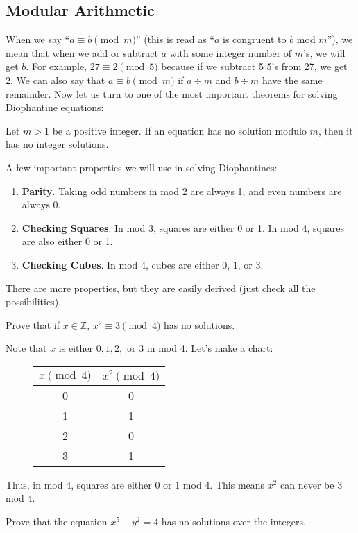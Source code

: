 \documentclass{article}
\begin{document}
\subsection{Modular Arithmetic}
When we say ``$a\equiv b\pmod{m}$'' (this is read as ``$a$ is congruent to $b$ mod $m$''), we mean that when we add or subtract $a$ with some integer number of $m$'s, we will get $b$. For example, $27\equiv 2\pmod{5}$ because if we subtract 5 5's from 27, we get 2. We can also say that $a\equiv b\pmod{m}$ if $a\div m$ and $b\div m$ have the same remainder. Now let us turn to one of the most important theorems for solving Diophantine equations:
\begin{theo} 
Let $m>1$ be a positive integer. If an equation has no solution modulo $m$, then it has no integer solutions.
\end{theo}
A few important properties we will use in solving Diophantines:
\begin{enumerate}
\item \textbf{Parity}. Taking odd numbers in mod 2 are always 1, and even numbers are always 0.
\item \textbf{Checking Squares}. In mod 3, squares are either 0 or 1. In mod 4, squares are also either 0 or 1. 
\item \textbf{Checking Cubes}. In mod 4, cubes are either 0, 1, or 3. 
\end{enumerate}
There are more properties, but they are easily derived (just check all the possibilities). 
\begin{exam}[Folklore]
Prove that if $x\in\mathbb{Z}$, $x^2\equiv 3\pmod{4}$ has no solutions.
\end{exam}
\begin{sol}
Note that $x$ is either $0,1,2,$ or 3 in mod 4. Let's make a chart:
\begin{figure}[H]
\centering
\begin{tabular}{c|c}
    $x\pmod{4}$ & $x^2\pmod{4}$\\
    \hline
    0 & 0\\
    1 & 1\\
    2 & 0\\
    3 & 1\\
\end{tabular}
\end{figure}
\noindent
Thus, in mod 4, squares are either 0 or 1 mod 4. This means $x^2$ can never be 3 mod 4.
\end{sol}
\begin{exam}[Balkan MO]
Prove that the equation $x^5-y^2=4$ has no solutions over the integers.
\end{exam}
\end{document}
